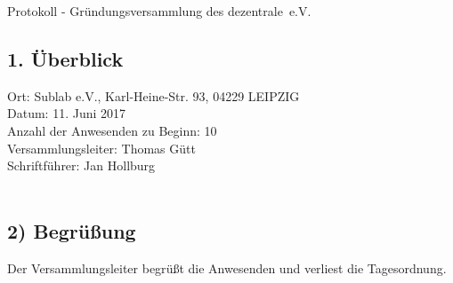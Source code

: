 \documentclass[10pt,a4paper]{scrartcl}
\newcommand{\qs}[1]{\glqq#1\grqq}
\newcommand{\name}{dezentrale}
\begin{document}
{\LARGE Protokoll - Gr{\"u}ndungsversammlung des \qs{\name\ e.V.}}
\subsection*{1. {\"U}berblick}
    Ort: Sublab e.V., Karl-Heine-Str. 93, 04229 LEIPZIG\\
    Datum: 11. Juni 2017\\
    Anzahl der Anwesenden zu Beginn: 10\\
    Versammlungsleiter: Thomas G{\"u}tt\\
    Schriftf{\"u}hrer: Jan Hollburg\\\\
\subsection*{2) Begr{\"u}{\ss}ung}
    Der Versammlungsleiter begr{\"u}{\ss}t die Anwesenden und verliest die Tagesordnung.\\\\
\end{document}
